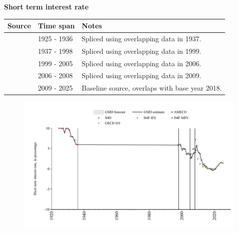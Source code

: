 \documentclass[12pt,a4paper,landscape]{article}
\begin{document}
\begin{adjustbox}{max totalsize={\paperwidth}{\paperheight},center}
\begin{minipage}[t][\textheight][t]{\textwidth}
\vspace*{0.5cm}
{}
\begin{center}
{\Large\bfseries Short term interest rate}
\end{center}
\vspace{0.5cm}
\begin{table}[H]
\centering
\small
\begin{tabular}{|l|l|l|}
\hline
\textbf{Source} & \textbf{Time span} & \textbf{Notes} \\
\hline
\rowcolor{white}\cite{IHD}& 1925 - 1936 &Spliced using overlapping data in 1937. \\
\rowcolor{lightgray}\cite{AMECO}& 1937 - 1998 &Spliced using overlapping data in 1999. \\
\rowcolor{white}\cite{OECD_EO}& 1999 - 2005 &Spliced using overlapping data in 2006. \\
\rowcolor{lightgray}\cite{IMF_MFS}& 2006 - 2008 &Spliced using overlapping data in 2009. \\
\rowcolor{white}\cite{OECD_EO}& 2009 - 2025 &Baseline source, overlaps with base year 2018. \\
\hline
\end{tabular}
\end{table}
\begin{figure}[H]
\centering
\includegraphics[width=\textwidth,height=0.6\textheight,keepaspectratio]{graphs/BGR_strate.pdf}
\end{figure}
\end{minipage}
\end{adjustbox}
\end{document}
